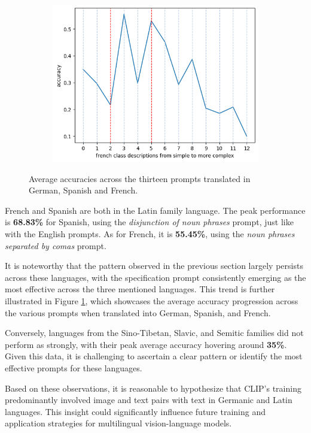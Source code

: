 \begin{figure}[ht]
\begin{subfigure}{0.31\textwidth}
        \includegraphics[width=\linewidth]{Images/frenchacc.png}
    \end{subfigure}

    \caption{Average accuracies across the thirteen prompts translated in German, Spanish and French.}
    \label{fig:lang-accs}
\end{figure} 


French and Spanish are both in the Latin family language. The peak performance is \textbf{68.83\%} for Spanish, using the \textit{disjunction of noun phrases} prompt, just like with the English prompts. As for French, it is \textbf{55.45\%}, using the \textit{noun phrases separated by comas} prompt.

It is noteworthy that the pattern observed in the previous section largely persists across these languages, with the specification prompt consistently emerging as the most effective across the three mentioned languages. This trend is further illustrated in Figure \ref{fig:lang-accs}, which showcases the average accuracy progression across the various prompts when translated into German, Spanish, and French.

Conversely, languages from the Sino-Tibetan, Slavic, and Semitic families did not perform as strongly, with their peak average accuracy hovering around \textbf{35\%}. Given this data, it is challenging to ascertain a clear pattern or identify the most effective prompts for these languages.

Based on these observations, it is reasonable to hypothesize that CLIP's training predominantly involved image and text pairs with text in Germanic and Latin languages. This insight could significantly influence future training and application strategies for multilingual vision-language models.

